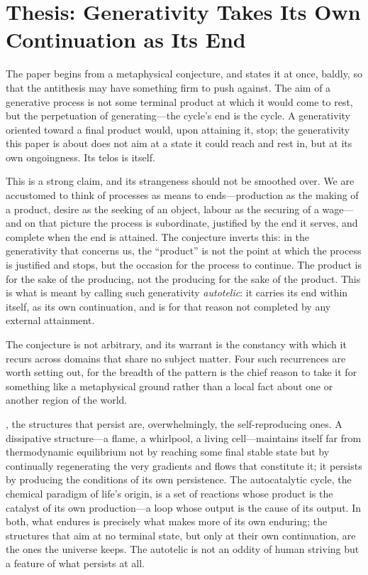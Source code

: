 \section{Thesis: Generativity Takes Its Own Continuation as Its End}
\label{p09:sec:thesis}

\noindent
The paper begins from a metaphysical conjecture, and states it at once, baldly, so that the antithesis may have something firm to push against.  The aim of a generative process is not some terminal product at which it would come to rest, but the perpetuation of generating---the cycle's end is the cycle. A generativity oriented toward a final product would, upon attaining it, stop; the generativity this paper is about does not aim at a state it could reach and rest in, but at its own ongoingness. Its telos is itself.

This is a strong claim, and its strangeness should not be smoothed over. We are accustomed to think of processes as means to ends---production as the making of a product, desire as the seeking of an object, labour as the securing of a wage---and on that picture the process is subordinate, justified by the end it serves, and complete when the end is attained. The conjecture inverts this: in the generativity that concerns us, the ``product'' is not the point at which the process is justified and stops, but the occasion for the process to continue. The product is for the sake of the producing, not the producing for the sake of the product. This is what is meant by calling such generativity \emph{autotelic}: it carries its end within itself, as its own continuation, and is for that reason not completed by any external attainment.

The conjecture is not arbitrary, and its warrant is the constancy with which it recurs across domains that share no subject matter. Four such recurrences are worth setting out, for the breadth of the pattern is the chief reason to take it for something like a metaphysical ground rather than a local fact about one or another region of the world.

, the structures that persist are, overwhelmingly, the self-reproducing ones. A dissipative structure---a flame, a whirlpool, a living cell---maintains itself far from thermodynamic equilibrium not by reaching some final stable state but by continually regenerating the very gradients and flows that constitute it; it persists by producing the conditions of its own persistence. The autocatalytic cycle, the chemical paradigm of life's origin, is a set of reactions whose product is the catalyst of its own production---a loop whose output is the cause of its output. In both, what endures is precisely what makes more of its own enduring; the structures that aim at no terminal state, but only at their own continuation, are the ones the universe keeps. The autotelic is not an oddity of human striving but a feature of what persists at all.

